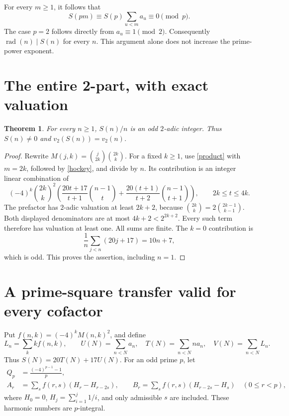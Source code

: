\documentclass[11pt,a4paper]{article}
\newtheorem{theorem}{Theorem}[section]
\theoremstyle{remark}\newtheorem{remark}[theorem]{Remark}
\newcommand{\rad}{\operatorname{rad}}
\begin{document}
For every \(m\ge1\), it follows that
\begin{equation}\label{primeprop}
 S(pm)\equiv S(p)\sum_{u<m}a_u\equiv0\pmod p.
\end{equation}
The case \(p=2\) follows directly from \(a_u\equiv1\pmod2\).
Consequently \(\rad(n)\mid S(n)\) for every \(n\).
This argument alone does not increase the prime-power exponent.

\section{The entire 2-part, with exact valuation}

\begin{theorem}\label{twoadic}
For every \(n\ge1\), \(S(n)/n\) is an odd \(2\)-adic integer.
Thus \(S(n)\ne0\) and \(v_2(S(n))=v_2(n)\).
\end{theorem}
\begin{proof}
Rewrite \(M(j,k)=\binom j{2k}\binom{2k}k\).
For a fixed \(k\ge1\), use \eqref{product} with \(m=2k\), followed
by \eqref{hockey}, and divide by \(n\). Its contribution is an integer
linear combination of
\[
 (-4)^k\binom{2k}k^2
 \left(
 \frac{20t+17}{t+1}\binom{n-1}t+
 \frac{20(t+1)}{t+2}\binom{n-1}{t+1}
 \right),\qquad 2k\le t\le4k.
\]
The prefactor has \(2\)-adic valuation at least \(2k+2\), because
\(\binom{2k}k=2\binom{2k-1}{k-1}\).
Both displayed denominators are at most \(4k+2<2^{2k+2}\).
Every such term therefore has valuation at least one.
All sums are finite. The \(k=0\) contribution is
\[
                  \frac1n\sum_{j<n}(20j+17)=10n+7,
\]
which is odd. This proves the assertion, including \(n=1\).
\end{proof}

\section{A prime-square transfer valid for every cofactor}

Put \(f(n,k)=(-4)^kM(n,k)^2\), and define
\[
 L_n=\sum_k kf(n,k),\qquad
 U(N)=\sum_{n<N}a_n,\quad T(N)=\sum_{n<N}n a_n,\quad
 V(N)=\sum_{n<N}L_n.
\]
Thus \(S(N)=20T(N)+17U(N)\).
For an odd prime \(p\), let
\[
 \begin{aligned}
 Q_p&=\frac{(-4)^{p-1}-1}{p},\\
 A_r&=\sum_s f(r,s)(H_r-H_{r-2s}),\qquad
 B_r=\sum_s f(r,s)(H_{r-2s}-H_s)\quad(0\le r<p),
 \end{aligned}
\]
where \(H_0=0\), \(H_j=\sum_{i=1}^j1/i\), and only admissible \(s\)
are included. These harmonic numbers are \(p\)-integral.
\end{document}
